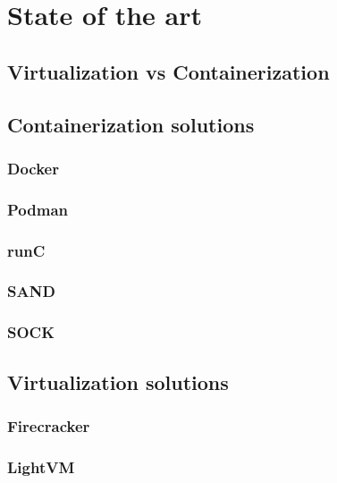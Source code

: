 \chapter{State of the art}

\section{Virtualization vs Containerization}

\section{Containerization solutions}
\subsection{Docker}
\subsection{Podman}
\subsection{runC}
\subsection{SAND}
\subsection{SOCK}

\section{Virtualization solutions}
\subsection{Firecracker}
\subsection{LightVM}
